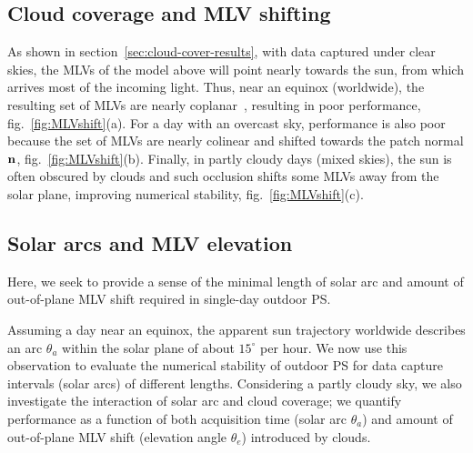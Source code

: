 \subsection{Cloud coverage and MLV shifting}
\label{subsec:mlv-clouds}

As shown in section~\ref{sec:cloud-cover-results}, with data captured under clear skies, the MLVs of the model above will point nearly towards the sun, from which arrives most of the incoming light. Thus, near an equinox (worldwide), the resulting set of MLVs are nearly coplanar~\cite{shen-pg-14}, resulting in poor performance, fig.~\ref{fig:MLVshift}(a). For a day with an overcast sky, performance is also poor because the set of MLVs are nearly colinear and shifted towards the patch normal ${\bf n}$, fig.~\ref{fig:MLVshift}(b). Finally, in partly cloudy days (mixed skies), the sun is often obscured by clouds and such occlusion shifts some MLVs away from the solar plane, improving numerical stability, fig.~\ref{fig:MLVshift}(c). 



\subsection{Solar arcs and MLV elevation}
\label{subsec:solararcs-mlvelevation}


Here, we seek to provide a sense of the minimal length of solar arc and amount of out-of-plane MLV shift required in single-day outdoor PS. 

Assuming a day near an equinox, the apparent sun trajectory worldwide describes an arc $\theta_a$ within the solar plane of about $15^\circ$ per hour. We now use this observation to evaluate the numerical stability of outdoor PS for data capture intervals (solar arcs) of different lengths. Considering a partly cloudy sky, we also investigate the interaction of solar arc and cloud coverage; we quantify performance as a function of both acquisition time (solar arc $\theta_a$) and amount of out-of-plane MLV shift (elevation angle $\theta_e$) introduced by clouds.


